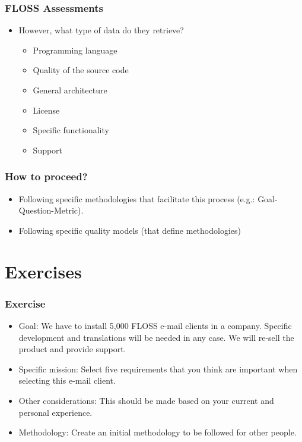 
\begin{frame}
\frametitle{FLOSS Assessments}

\begin{itemize}
\item However, what type of data do they retrieve?
 \begin{itemize}
   \item Programming language
   \item Quality of the source code
   \item General architecture
   \item License
   \item Specific functionality
   \item Support
 \end{itemize}
\end{itemize}
\end{frame}



\begin{frame}
\frametitle{How to proceed?}

\begin{itemize}
\item Following specific methodologies that facilitate this process (e.g.: Goal-Question-Metric).
\item Following specific quality models (that define methodologies)
\end{itemize}
\end{frame}

\section{Exercises}

\begin{frame}
\frametitle{Exercise}

\begin{itemize}
\item Goal: We have to install 5,000 FLOSS e-mail clients in a company. Specific development and
translations will be needed in any case. We will re-sell the product and provide support.
\item Specific mission: Select five requirements that you think are important when selecting this e-mail client.
\item Other considerations: This should be made based on your current and personal experience.
\item Methodology: Create an initial methodology to be followed for other people.
\end{itemize}
\end{frame}


